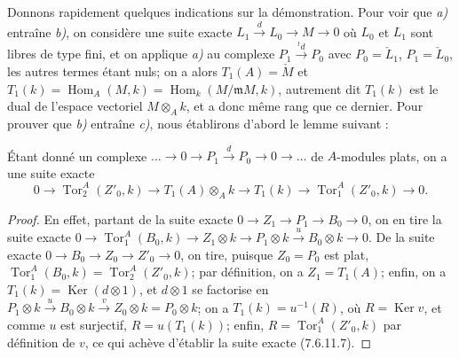 \begin{remark}[7.6.11]
Donnons rapidement quelques indications sur la démonstration. Pour voir que \emph{a)}
entraîne \emph{b)}, on considère une suite exacte
$L_1\xrightarrow{d}L_0\longrightarrow M\longrightarrow0$
où $L_0$ et $L_1$ sont libres de type fini, et on applique \emph{a)} au complexe
$P_1\xrightarrow{{}^t d}P_0$ avec $P_0=\check L_1$, $P_1=\check L_0$,
les autres termes étant nuls; on a alors $T_1(A)=\check M$ et
$T_1(k)=\operatorname{Hom}_A(M,k)=\operatorname{Hom}_k(M/\mathfrak mM,k)$,
autrement dit $T_1(k)$ est le dual de l'espace vectoriel $M\otimes_A k$, et a
donc même rang que ce dernier. Pour prouver que \emph{b)} entraîne \emph{c)}, nous établirons
d'abord le lemme suivant :

\begin{lemma}[7.6.11.6]
Étant donné un complexe
$\ldots\longrightarrow0\longrightarrow P_1\xrightarrow{d}P_0\longrightarrow0\longrightarrow\ldots$
de $A$-modules plats, on a une suite exacte
\[
  0\longrightarrow\operatorname{Tor}_2^A(Z'_0,k)
  \longrightarrow T_1(A)\otimes_A k
  \longrightarrow T_1(k)
  \longrightarrow\operatorname{Tor}_1^A(Z'_0,k)
  \longrightarrow0.
  \tag{7.6.11.7}\label{III.7.6.11.7.fr}
\]
\end{lemma}

\begin{proof}
En effet, partant de la suite exacte
$0\to Z_1\to P_1\to B_0\to0$, on en tire la suite exacte
$0\longrightarrow\operatorname{Tor}_1^A(B_0,k)\longrightarrow Z_1\otimes k\longrightarrow P_1\otimes k\xrightarrow{u}B_0\otimes k\longrightarrow0$.
De la suite exacte $0\to B_0\to Z_0\to Z'_0\to0$, on tire, puisque $Z_0=P_0$
est plat,
$\operatorname{Tor}_1^A(B_0,k)=\operatorname{Tor}_2^A(Z'_0,k)$; par définition,
on a $Z_1=T_1(A)$; enfin, on a $T_1(k)=\operatorname{Ker}(d\otimes1)$, et
$d\otimes1$ se factorise en
$P_1\otimes k\xrightarrow{u}B_0\otimes k\xrightarrow{v}Z_0\otimes k=P_0\otimes k$;
on a $T_1(k)=u^{-1}(R)$, où $R=\operatorname{Ker}v$, et comme $u$ est
surjectif, $R=u(T_1(k))$; enfin,
$R=\operatorname{Tor}_1^A(Z'_0,k)$ par définition de $v$, ce qui achève
d'établir la suite exacte (7.6.11.7).
\end{proof}


\end{remark}
